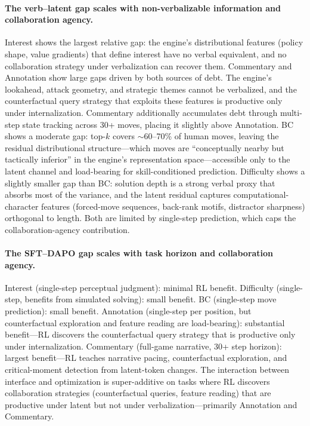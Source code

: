 \paragraph{The verb--latent gap scales with non-verbalizable information
and collaboration agency.}
Interest shows the largest relative gap: the engine's distributional
features (policy shape, value gradients) that define interest have no
verbal equivalent, and no collaboration strategy under verbalization can
recover them.
Commentary and Annotation show large gaps driven by both sources of debt.
The engine's lookahead, attack geometry, and strategic themes cannot be
verbalized, and the counterfactual query strategy that exploits these
features is productive only under internalization.
Commentary additionally accumulates debt through multi-step state tracking
across 30+ moves, placing it slightly above Annotation.
BC shows a moderate gap: top-$k$ covers ${\sim}$60--70\% of human moves,
leaving the residual distributional structure---which moves are
``conceptually nearby but tactically inferior'' in the engine's
representation space---accessible only to the latent channel and
load-bearing for skill-conditioned prediction.
Difficulty shows a slightly smaller gap than BC: solution depth is a
strong verbal proxy that absorbs most of the variance, and the latent
residual captures computational-character features (forced-move
sequences, back-rank motifs, distractor sharpness) orthogonal to length.
Both are limited by single-step prediction, which caps the
collaboration-agency contribution.

\paragraph{The SFT--DAPO gap scales with task horizon and collaboration
agency.}
Interest (single-step perceptual judgment): minimal RL benefit.
Difficulty (single-step, benefits from simulated solving): small benefit.
BC (single-step move prediction): small benefit.
Annotation (single-step per position, but counterfactual exploration and
feature reading are load-bearing): substantial benefit---RL discovers the
counterfactual query strategy that is productive only under internalization.
Commentary (full-game narrative, 30+ step horizon): largest benefit---RL
teaches narrative pacing, counterfactual exploration, and critical-moment
detection from latent-token changes.
The interaction between interface and optimization is super-additive
on tasks where RL discovers collaboration strategies (counterfactual
queries, feature reading) that are productive under latent but not under
verbalization---primarily Annotation and Commentary.

